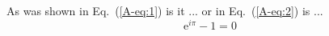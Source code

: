 \documentclass{article}
\begin{document}
  \setcounter{equation}{5}

  As was shown in Eq.~(\ref{A-eq:1}) is it
  ... or in Eq.~(\ref{A-eq:2}) is ...
  \begin{equation}
    \mathrm{e}^{i\pi}-1=0 \label{eq:x}
  \end{equation}
\end{document}

